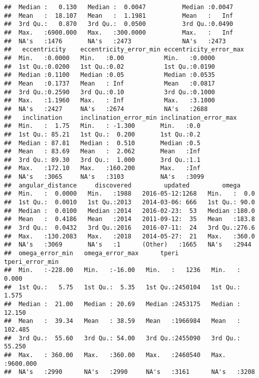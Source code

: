 \documentclass[]{article}
\begin{document}
\begin{verbatim}
##  Median :   0.130   Median :  0.0047          Median :0.0047           
##  Mean   :  18.107   Mean   :  1.1981          Mean   :   Inf           
##  3rd Qu.:   0.870   3rd Qu.:  0.0500          3rd Qu.:0.0490           
##  Max.   :6900.000   Max.   :300.0000          Max.   :   Inf           
##  NA's   :1476       NA's   :2473              NA's   :2473             
##   eccentricity    eccentricity_error_min eccentricity_error_max
##  Min.   :0.0000   Min.   :0.00           Min.   :0.0000        
##  1st Qu.:0.0200   1st Qu.:0.02           1st Qu.:0.0190        
##  Median :0.1100   Median :0.05           Median :0.0535        
##  Mean   :0.1737   Mean   : Inf           Mean   :0.0817        
##  3rd Qu.:0.2590   3rd Qu.:0.10           3rd Qu.:0.1000        
##  Max.   :1.1960   Max.   : Inf           Max.   :3.1000        
##  NA's   :2427     NA's   :2674           NA's   :2688          
##   inclination     inclination_error_min inclination_error_max
##  Min.   :  1.75   Min.   : -1.300       Min.   :0.0          
##  1st Qu.: 85.21   1st Qu.:  0.200       1st Qu.:0.2          
##  Median : 87.81   Median :  0.510       Median :0.5          
##  Mean   : 83.69   Mean   :  2.062       Mean   :Inf          
##  3rd Qu.: 89.30   3rd Qu.:  1.000       3rd Qu.:1.1          
##  Max.   :172.10   Max.   :160.200       Max.   :Inf          
##  NA's   :3065     NA's   :3103          NA's   :3099         
##  angular_distance     discovered         updated         omega      
##  Min.   :  0.0000   Min.   :1988   2016-05-12:1268   Min.   :  0.0  
##  1st Qu.:  0.0010   1st Qu.:2013   2014-03-06: 666   1st Qu.: 90.0  
##  Median :  0.0100   Median :2014   2016-02-23:  53   Median :180.0  
##  Mean   :  0.4186   Mean   :2014   2011-09-12:  35   Mean   :183.8  
##  3rd Qu.:  0.0432   3rd Qu.:2016   2016-07-11:  24   3rd Qu.:276.6  
##  Max.   :130.2083   Max.   :2018   2014-05-27:  21   Max.   :360.0  
##  NA's   :3069       NA's   :1      (Other)   :1665   NA's   :2944   
##  omega_error_min   omega_error_max      tperi         tperi_error_min   
##  Min.   :-228.00   Min.   :-16.00   Min.   :   1236   Min.   :   0.000  
##  1st Qu.:   5.75   1st Qu.:  5.35   1st Qu.:2450104   1st Qu.:   1.575  
##  Median :  21.00   Median : 20.69   Median :2453175   Median :  12.150  
##  Mean   :  39.34   Mean   : 38.59   Mean   :1966984   Mean   : 102.485  
##  3rd Qu.:  55.60   3rd Qu.: 54.00   3rd Qu.:2455090   3rd Qu.:  55.250  
##  Max.   : 360.00   Max.   :360.00   Max.   :2460540   Max.   :9600.000  
##  NA's   :2990      NA's   :2990     NA's   :3161      NA's   :3208      

\end{verbatim}
\end{document}
